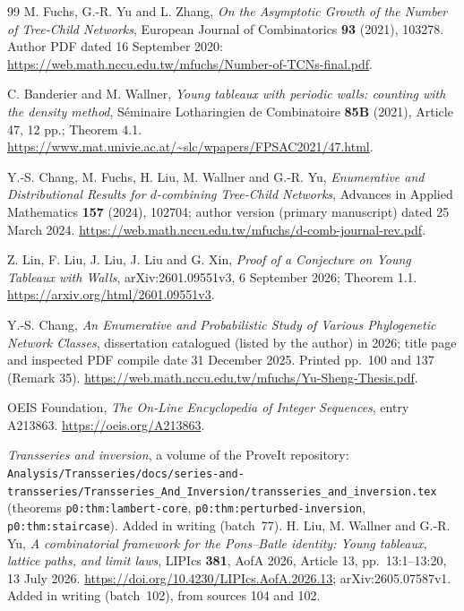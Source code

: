 \documentclass[11pt,letterpaper]{article}
\theoremstyle{remark}
\begin{document}
\begin{thebibliography}{99}\small\setlength{\itemsep}{2pt}
M. Fuchs, G.-R. Yu and L. Zhang,
\emph{On the Asymptotic Growth of the Number of Tree-Child Networks},
European Journal of Combinatorics \textbf{93} (2021), 103278.
Author PDF dated 16 September 2020:
\url{https://web.math.nccu.edu.tw/mfuchs/Number-of-TCNs-final.pdf}.

C. Banderier and M. Wallner,
\emph{Young tableaux with periodic walls: counting with the density method},
S\'eminaire Lotharingien de Combinatoire \textbf{85B} (2021), Article 47, 12 pp.; Theorem 4.1.
\url{https://www.mat.univie.ac.at/~slc/wpapers/FPSAC2021/47.html}.

Y.-S. Chang, M. Fuchs, H. Liu, M. Wallner and G.-R. Yu,
\emph{Enumerative and Distributional Results for $d$-combining Tree-Child Networks},
Advances in Applied Mathematics \textbf{157} (2024), 102704; author version (primary manuscript) dated 25 March 2024.
\url{https://web.math.nccu.edu.tw/mfuchs/d-comb-journal-rev.pdf}.

Z. Lin, F. Liu, J. Liu, J. Liu and G. Xin,
\emph{Proof of a Conjecture on Young Tableaux with Walls},
arXiv:2601.09551v3, 6 September 2026; Theorem 1.1.
\url{https://arxiv.org/html/2601.09551v3}.

Y.-S. Chang,
\emph{An Enumerative and Probabilistic Study of Various Phylogenetic Network Classes},
dissertation catalogued (listed by the author) in 2026; title page and inspected PDF compile date 31 December 2025.
Printed pp.~100 and 137 (Remark 35).
\url{https://web.math.nccu.edu.tw/mfuchs/Yu-Sheng-Thesis.pdf}.

OEIS Foundation, \emph{The On-Line Encyclopedia of Integer Sequences}, entry A213863.
\url{https://oeis.org/A213863}.

\emph{Transseries and inversion}, a volume of the ProveIt repository:
\nolinkurl{Analysis/Transseries/docs/series-and-transseries/Transseries_And_Inversion/transseries_and_inversion.tex}
(theorems \textup{\nolinkurl{p0:thm:lambert-core}}, \textup{\nolinkurl{p0:thm:perturbed-inversion}}, \texttt{p0:thm:staircase}). Added in writing (batch~77).
H. Liu, M. Wallner and G.-R. Yu,
\emph{A combinatorial framework for the Pons--Batle identity: Young tableaux, lattice paths, and limit laws},
LIPIcs \textbf{381}, AofA 2026, Article 13, pp.~13:1--13:20, 13 July 2026.
\url{https://doi.org/10.4230/LIPIcs.AofA.2026.13}; arXiv:2605.07587v1. Added in writing (batch~102), from sources 104 and 102.


\end{thebibliography}
\end{document}
